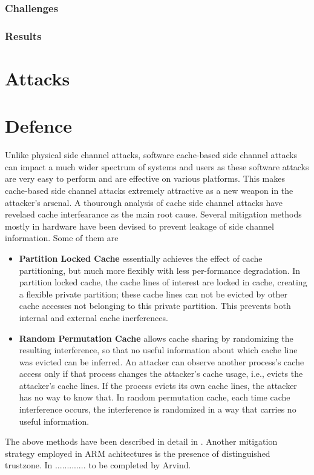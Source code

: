 \documentclass[twocolumn]{IEEEtran}
\begin{document}
\subsubsection {Challenges}
\subsubsection {Results}
\section {Attacks}

\section {Defence}

Unlike physical side channel attacks, software cache-based side channel  attacks can impact a much wider spectrum of systems and users as these software attacks are very easy to perform and are effective on various platforms. This makes cache-based side channel attacks extremely attractive as a new weapon in the attacker’s arsenal. A thourough analysis of cache side channel attacks have revelaed cache interfearance as the main root cause. Several mitigation methods mostly in hardware have been devised to prevent leakage of side channel information. Some of them are

\begin{itemize}
\item \textbf {Partition Locked Cache} essentially achieves the effect of cache partitioning, but much more flexibly with less per-formance degradation. In partition locked cache, the cache lines of interest are locked in cache, creating a flexible private partition; these cache lines can not be evicted by other cache accesses not belonging to this private partition. This prevents both internal and external cache inerferences.

\item \textbf {Random Permutation Cache} allows cache sharing by randomizing the resulting interference, so that no useful information about which cache line was evicted can be inferred. An attacker can observe another process’s cache access only if that process changes the attacker’s cache usage, i.e., evicts the attacker’s cache lines. If the process evicts its own cache lines, the attacker has no way to know that.  In random permutation cache, each time cache interference occurs, the interference is randomized in a way that carries no useful information. 

\end{itemize}

The above methods have been described in detail in \cite{wang2007new}. Another mitigation strategy employed in ARM achitectures is the presence of distinguished trustzone. In ............. to be completed by Arvind.


\end{document}
